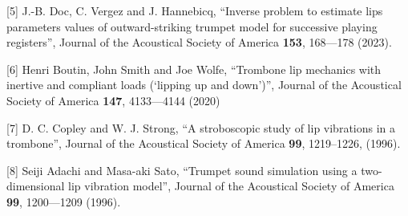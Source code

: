   [5] J.-B. Doc, C. Vergez and J. Hannebicq, “Inverse problem to estimate lips 
  parameters values of outward-striking trumpet model for successive playing 
  registers”, Journal of the Acoustical Society of America \textbf{153}, 
  168—178 (2023). 

  [6] Henri Boutin, John Smith and Joe Wolfe, “Trombone lip mechanics with 
  inertive and compliant loads (‘lipping up and down’)”, Journal of the 
  Acoustical Society of America \textbf{147}, 4133—4144 (2020) 

  [7] D. C. Copley and W. J. Strong, “A stroboscopic study of lip vibrations in 
  a trombone”, Journal of the Acoustical Society of America \textbf{99}, 
  1219–1226, (1996). 

  [8] Seiji Adachi and Masa-aki Sato, “Trumpet sound simulation using a 
  two-dimensional lip vibration model”, Journal of the Acoustical Society of 
  America \textbf{99}, 1200—1209 (1996). 